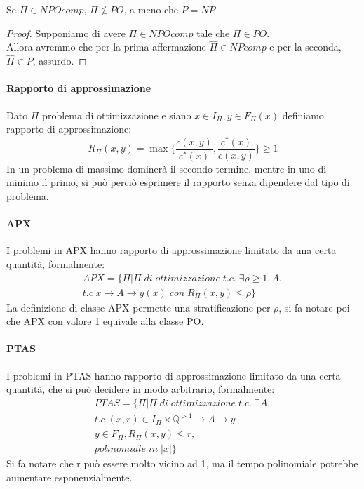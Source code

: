 \begin{theorem}
    Se $\Pi \in \mathit{NPOcomp}$, $\Pi \notin PO$, a meno che $P=NP$
\end{theorem}
\begin{proof}
    Supponiamo di avere $\Pi \in \mathit{NPOcomp}$ tale che $\Pi \in PO$.\\
    Allora avremmo che per la prima affermazione $\hat{\Pi} \in \mathit{NPcomp}$ e per la seconda, 
    $\hat{\Pi} \in P$, assurdo.
\end{proof}

\paragraph{Rapporto di approssimazione}
Dato $\Pi$ problema di ottimizzazione e siano $x \in I_\Pi, y \in F_\Pi(x)$ definiamo
rapporto di approssimazione:
$$R_\Pi(x, y) = \max\bigg\{\frac{c(x, y)}{c^*(x)}, \frac{c^*(x)}{c(x, y)}\bigg\}\geq 1$$
In un problema di massimo dominerà il secondo termine, mentre in uno di minimo il primo, 
si può perciò esprimere il rapporto senza dipendere dal tipo di problema.

\paragraph{APX}
I problemi in APX hanno rapporto di approssimazione limitato da una certa quantità, 
formalmente: 
\begin{equation}
    \begin{aligned}
        \mathit{APX} = \{\Pi | \Pi \mathit{\;di\;ottimizzazione\;t.c.\;}
\exists \rho \geq 1, A, \\\mathit{t.c\;} x\rightarrow A \rightarrow y(x)\;\mathit{con}\;R_\Pi(x, y) \leq \rho\}
    \end{aligned}
\end{equation}
La definizione di classe APX permette una stratificazione per $\rho$, si fa notare poi che APX 
con valore 1 equivale alla classe PO.

\paragraph{PTAS}
I problemi in PTAS hanno rapporto di approssimazione limitato da una certa quantità,
che si può decidere in modo arbitrario, formalmente: 
\begin{equation}
    \begin{aligned}
        \mathit{PTAS} = \{\Pi | \Pi \mathit{\;di\;ottimizzazione\;t.c.\;}\exists A, \\
\mathit{t.c\;} (x, r) \in I_\Pi \times \mathbb{Q}^{>1} \rightarrow A \rightarrow y \\
y \in F_\Pi, R_\Pi(x, y) \leq r, \\\mathit{polinomiale\;in\;} |x|\}
    \end{aligned}
\end{equation}
Si fa notare che r può essere molto vicino ad 1, ma il tempo polinomiale
potrebbe aumentare esponenzialmente.

